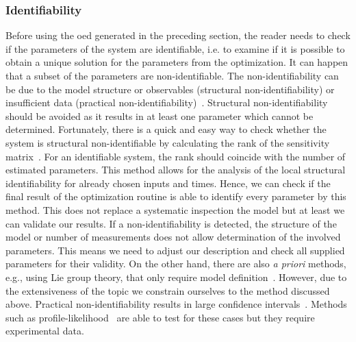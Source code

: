 \documentclass[10pt,A4paper]{article}
\begin{document}
\subsubsection*{Identifiability}
Before using the \acl{oed} generated in the preceding section, the reader needs to check if the parameters of the system are identifiable, i.e. to examine if it is possible to obtain a unique solution for the parameters from the optimization.
It can happen that a subset of the parameters are non-identifiable.
The non-identifiability can be due to the model structure or observables (structural non-identifiability) or insufficient data (practical non-identifiability)~\cite{guillaume_introductory_2019, wieland_structural_2021, walter_identifiability_1996}.
Structural non-identifiability should be avoided as it results in at least one parameter which cannot be determined.
Fortunately, there is a quick and easy way to check whether the system is structural non-identifiable by calculating the rank of the sensitivity matrix~\cite{miao_identifiability_2011, stigter_fast_2015}.
For an identifiable system, the rank should coincide with the number of estimated parameters.
This method allows for the analysis of the local structural identifiability for already chosen inputs and times.
Hence, we can check if the final result of the optimization routine is able to identify every parameter by this method.
This does not replace a systematic inspection the model but at least we can validate our results.
If a non-identifiability is detected, the structure of the model or number of measurements does not allow determination of the involved parameters.
This means we need to adjust our description and check all supplied parameters for their validity.
On the other hand, there are also {\it a priori} methods, e.g., using Lie group theory, that only require model definition~\cite{wieland_structural_2021}.
However, due to the extensiveness of the topic we constrain ourselves to the method discussed above.
Practical non-identifiability results in large confidence intervals~\cite{holmberg_practical_1982, miao_identifiability_2011, kreutzProfileLikelihood2013}.
Methods such as profile-likelihood~\cite{wieland_structural_2021} are able to test for these cases but they require experimental data.
%
\end{document}
